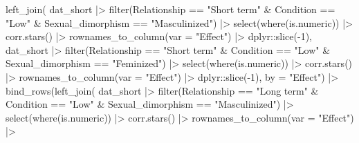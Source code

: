 \documentclass[
  bookmarksnumbered]{article}
\newenvironment{Shaded}{\begin{snugshade}}{\end{snugshade}}
\newcommand{\AttributeTok}[1]{\textcolor[rgb]{0.80,0.80,0.80}{#1}}
\newcommand{\DecValTok}[1]{\textcolor[rgb]{0.86,0.86,0.80}{#1}}
\newcommand{\FunctionTok}[1]{\textcolor[rgb]{0.94,0.94,0.56}{#1}}
\newcommand{\NormalTok}[1]{\textcolor[rgb]{0.80,0.80,0.80}{#1}}
\newcommand{\SpecialCharTok}[1]{\textcolor[rgb]{0.86,0.64,0.64}{#1}}
\newcommand{\StringTok}[1]{\textcolor[rgb]{0.80,0.58,0.58}{#1}}
\begin{document}
\begin{Shaded}
\begin{Highlighting}[]
\FunctionTok{left\_join}\NormalTok{(}
\NormalTok{  dat\_short }\SpecialCharTok{|\textgreater{}}
    \FunctionTok{filter}\NormalTok{(Relationship }\SpecialCharTok{==} \StringTok{"Short term"} \SpecialCharTok{\&}
\NormalTok{             Condition }\SpecialCharTok{==} \StringTok{"Low"} \SpecialCharTok{\&} 
\NormalTok{             Sexual\_dimorphism }\SpecialCharTok{==} \StringTok{"Masculinized"}\NormalTok{) }\SpecialCharTok{|\textgreater{}}
    \FunctionTok{select}\NormalTok{(}\FunctionTok{where}\NormalTok{(is.numeric)) }\SpecialCharTok{|\textgreater{}} 
    \FunctionTok{corr.stars}\NormalTok{() }\SpecialCharTok{|\textgreater{}}
    \FunctionTok{rownames\_to\_column}\NormalTok{(}\AttributeTok{var =} \StringTok{"Effect"}\NormalTok{) }\SpecialCharTok{|\textgreater{}} 
\NormalTok{    dplyr}\SpecialCharTok{::}\FunctionTok{slice}\NormalTok{(}\SpecialCharTok{{-}}\DecValTok{1}\NormalTok{),}
\NormalTok{  dat\_short }\SpecialCharTok{|\textgreater{}}
    \FunctionTok{filter}\NormalTok{(Relationship }\SpecialCharTok{==} \StringTok{"Short term"} \SpecialCharTok{\&}
\NormalTok{             Condition }\SpecialCharTok{==} \StringTok{"Low"} \SpecialCharTok{\&} 
\NormalTok{             Sexual\_dimorphism }\SpecialCharTok{==} \StringTok{"Feminized"}\NormalTok{) }\SpecialCharTok{|\textgreater{}}
    \FunctionTok{select}\NormalTok{(}\FunctionTok{where}\NormalTok{(is.numeric)) }\SpecialCharTok{|\textgreater{}} 
    \FunctionTok{corr.stars}\NormalTok{() }\SpecialCharTok{|\textgreater{}}
    \FunctionTok{rownames\_to\_column}\NormalTok{(}\AttributeTok{var =} \StringTok{"Effect"}\NormalTok{) }\SpecialCharTok{|\textgreater{}} 
\NormalTok{    dplyr}\SpecialCharTok{::}\FunctionTok{slice}\NormalTok{(}\SpecialCharTok{{-}}\DecValTok{1}\NormalTok{),}
  \AttributeTok{by =} \StringTok{"Effect"}\NormalTok{) }\SpecialCharTok{|\textgreater{}} 
  \FunctionTok{bind\_rows}\NormalTok{(}\FunctionTok{left\_join}\NormalTok{(}
\NormalTok{    dat\_short }\SpecialCharTok{|\textgreater{}}
      \FunctionTok{filter}\NormalTok{(Relationship }\SpecialCharTok{==} \StringTok{"Long term"} \SpecialCharTok{\&}
\NormalTok{               Condition }\SpecialCharTok{==} \StringTok{"Low"} \SpecialCharTok{\&} 
\NormalTok{               Sexual\_dimorphism }\SpecialCharTok{==} \StringTok{"Masculinized"}\NormalTok{) }\SpecialCharTok{|\textgreater{}}
      \FunctionTok{select}\NormalTok{(}\FunctionTok{where}\NormalTok{(is.numeric)) }\SpecialCharTok{|\textgreater{}} 
      \FunctionTok{corr.stars}\NormalTok{() }\SpecialCharTok{|\textgreater{}}
      \FunctionTok{rownames\_to\_column}\NormalTok{(}\AttributeTok{var =} \StringTok{"Effect"}\NormalTok{) }\SpecialCharTok{|\textgreater{}} 

\end{Highlighting}
\end{Shaded}
\end{document}
